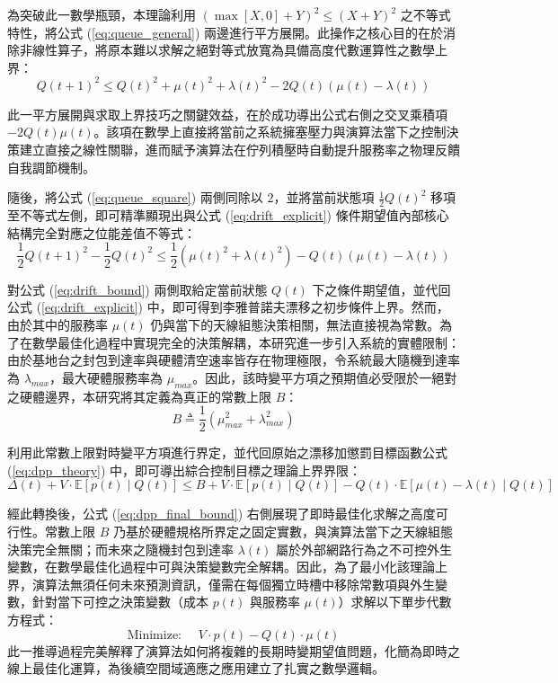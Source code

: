 為突破此一數學瓶頸，本理論利用 $\left(\max[X, 0] + Y\right)^2 \le (X + Y)^2$ 之不等式特性，將公式 (\ref{eq:queue_general}) 兩邊進行平方展開。此操作之核心目的在於消除非線性算子，將原本難以求解之絕對等式放寬為具備高度代數運算性之數學上界：
\begin{equation}
    Q(t+1)^2 \le Q(t)^2 + \mu(t)^2 + \lambda(t)^2 - 2Q(t)\left(\mu(t) - \lambda(t)\right)
    \label{eq:queue_square}
\end{equation}

此一平方展開與求取上界技巧之關鍵效益，在於成功導出公式右側之交叉乘積項 $-2Q(t)\mu(t)$。該項在數學上直接將當前之系統擁塞壓力與演算法當下之控制決策建立直接之線性關聯，進而賦予演算法在佇列積壓時自動提升服務率之物理反饋自我調節機制。

隨後，將公式 (\ref{eq:queue_square}) 兩側同除以 $2$，並將當前狀態項 $\frac{1}{2}Q(t)^2$ 移項至不等式左側，即可精準顯現出與公式 (\ref{eq:drift_explicit}) 條件期望值內部核心結構完全對應之位能差值不等式：
\begin{equation}
    \frac{1}{2}Q(t+1)^2 - \frac{1}{2}Q(t)^2 \le \frac{1}{2}\left(\mu(t)^2 + \lambda(t)^2\right) - Q(t)\left(\mu(t) - \lambda(t)\right)
    \label{eq:drift_bound}
\end{equation}

對公式 (\ref{eq:drift_bound}) 兩側取給定當前狀態 $Q(t)$ 下之條件期望值，並代回公式 (\ref{eq:drift_explicit}) 中，即可得到李雅普諾夫漂移之初步條件上界。然而，由於其中的服務率 $\mu(t)$ 仍與當下的天線組態決策相關，無法直接視為常數。為了在數學最佳化過程中實現完全的決策解耦，本研究進一步引入系統的實體限制：由於基地台之封包到達率與硬體清空速率皆存在物理極限，令系統最大隨機到達率為 $\lambda_{max}$，最大硬體服務率為 $\mu_{max}$。因此，該時變平方項之預期值必受限於一絕對之硬體邊界，本研究將其定義為真正的常數上限 $B$：
\begin{equation}
    B \triangleq \frac{1}{2}(\mu_{max}^2 + \lambda_{max}^2)
    \label{eq:constant_B_def}
\end{equation}

利用此常數上限對時變平方項進行界定，並代回原始之漂移加懲罰目標函數公式 (\ref{eq:dpp_theory}) 中，即可導出綜合控制目標之理論上界界限：
\begin{equation}
    \Delta(t) + V \cdot \mathbb{E}[p(t) \mid Q(t)] \le B + V \cdot \mathbb{E}[p(t) \mid Q(t)] - Q(t) \cdot \mathbb{E}[\mu(t) - \lambda(t) \mid Q(t)]
    \label{eq:dpp_final_bound}
\end{equation}

經此轉換後，公式 (\ref{eq:dpp_final_bound}) 右側展現了即時最佳化求解之高度可行性。常數上限 $B$ 乃基於硬體規格所界定之固定實數，與演算法當下之天線組態決策完全無關；而未來之隨機封包到達率 $\lambda(t)$ 屬於外部網路行為之不可控外生變數，在數學最佳化過程中可與決策變數完全解耦。因此，為了最小化該理論上界，演算法無須任何未來預測資訊，僅需在每個獨立時槽中移除常數項與外生變數，針對當下可控之決策變數（成本 $p(t)$ 與服務率 $\mu(t)$）求解以下單步代數方程式：
\begin{equation}
    \text{Minimize: } \quad V \cdot p(t) - Q(t) \cdot \mu(t)
    \label{eq:lyapunov_magic}
\end{equation}
此一推導過程完美解釋了演算法如何將複雜的長期時變期望值問題，化簡為即時之線上最佳化運算，為後續空間域適應之應用建立了扎實之數學邏輯。

